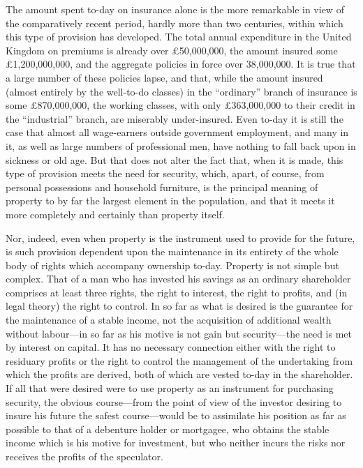 \documentclass{book}
\begin{document}
The amount spent to-day on insurance alone is the more remarkable in view of the comparatively recent period, hardly more than two centuries, within which this type of provision has developed. The total annual expenditure in the United Kingdom on premiums is already over £50,000,000, the amount insured some £1,200,000,000, and the aggregate policies in force over 38,000,000. It is true that a large number of these policies lapse, and that, while the amount insured (almost entirely by the well-to-do classes) in the “ordinary” branch of insurance is some £870,000,000, the working classes, with only £363,000,000 to their credit in the “industrial” branch, are miserably under-insured. Even to-day it is still the case that almost all wage-earners outside government employment, and many in it, as well as large numbers of professional men, have nothing to fall back upon in sickness or old age. But that does not alter the fact that, when it is made, this type of provision meets the need for security, which, apart, of course, from personal possessions and household furniture, is the principal meaning of property to by far the largest element in the population, and that it meets it more completely and certainly than property itself.

Nor, indeed, even when property is the instrument used to provide for the future, is such provision dependent upon the maintenance in its entirety of the whole body of rights which accompany ownership to-day. Property is not simple but complex. That of a man who has invested his savings as an ordinary shareholder comprises at least three rights, the right to interest, the right to profits, and (in legal theory) the right to control. In so far as what is desired is the guarantee for the maintenance of a stable income, not the acquisition of additional wealth without labour—in so far as his motive is not gain but security—the need is met by interest on capital. It has no necessary connection either with the right to residuary profits or the right to control the management of the undertaking from which the profits are derived, both of which are vested to-day in the shareholder. If all that were desired were to use property as an instrument for purchasing security, the obvious course—from the point of view of the investor desiring to insure his future the safest course—would be to assimilate his position as far as possible to that of a debenture holder or mortgagee, who obtains the stable income which is his motive for investment, but who neither incurs the risks nor receives the profits of the speculator.
\end{document}
